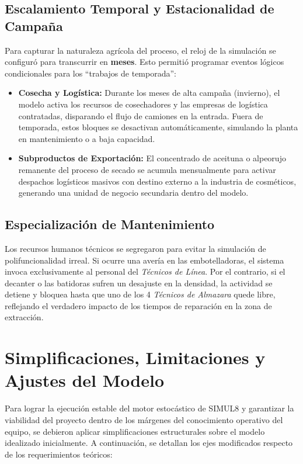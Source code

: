 \documentclass[runningheads]{llncs}
\begin{document}
\subsection{Escalamiento Temporal y Estacionalidad de Campaña}
Para capturar la naturaleza agrícola del proceso, el reloj de la simulación se configuró para transcurrir en \textbf{meses}. Esto permitió programar eventos lógicos condicionales para los ``trabajos de temporada'':
\begin{itemize}
    \item \textbf{Cosecha y Logística:} Durante los meses de alta campaña (invierno), el modelo activa los recursos de cosechadores y las empresas de logística contratadas, disparando el flujo de camiones en la entrada. Fuera de temporada, estos bloques se desactivan automáticamente, simulando la planta en mantenimiento o a baja capacidad.
    \item \textbf{Subproductos de Exportación:} El concentrado de aceituna o alpeorujo remanente del proceso de secado se acumula mensualmente para activar despachos logísticos masivos con destino externo a la industria de cosméticos, generando una unidad de negocio secundaria dentro del modelo.
\end{itemize}

\subsection{Especialización de Mantenimiento}
Los recursos humanos técnicos se segregaron para evitar la simulación de polifuncionalidad irreal. Si ocurre una avería en las embotelladoras, el sistema invoca exclusivamente al personal del \textit{Técnicos de Línea}. Por el contrario, si el decanter o las batidoras sufren un desajuste en la densidad, la actividad se detiene y bloquea hasta que uno de los 4 \textit{Técnicos de Almazara} quede libre, reflejando el verdadero impacto de los tiempos de reparación en la zona de extracción.


\section{Simplificaciones, Limitaciones y Ajustes del Modelo}

Para lograr la ejecución estable del motor estocástico de SIMUL8 y garantizar la viabilidad del proyecto dentro de los márgenes del conocimiento operativo del equipo, se debieron aplicar simplificaciones estructurales sobre el modelo idealizado inicialmente. A continuación, se detallan los ejes modificados respecto de los requerimientos teóricos:
\end{document}
